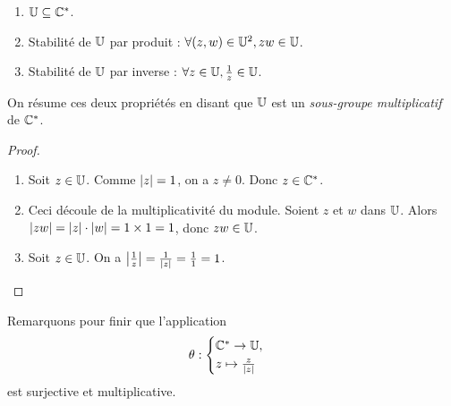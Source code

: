 \begin{proposition}
\begin{enumerate}
\item $\mathbb{U} \subseteq \mathbb{C}^*$.
\item Stabilité de $\mathbb{U}$ par produit : $\forall (z,w)\in\mathbb{U}^2, zw\in\mathbb{U}$.
\item Stabilité de $\mathbb{U}$ par inverse : $\forall z\in\mathbb{U}, \frac{1}{z} \in\mathbb{U}$.
\end{enumerate}
On résume ces deux propriétés en disant que $\mathbb{U}$ est un \emph{sous-groupe multiplicatif} de $\mathbb{C}^*$.
\end{proposition}
\begin{proof}
\begin{enumerate}
\item Soit $z\in\mathbb{U}$. Comme $\left\lvert z\right\rvert=1$, on a $z\neq 0$. Donc $z\in\mathbb{C}^*$.
\item Ceci découle de la multiplicativité du module. Soient $z$ et $w$ dans $\mathbb{U}$. Alors $\left\lvert zw\right\rvert = \left\lvert z\right\rvert \cdot \left\lvert w\right\rvert = 1\times 1 = 1$, donc $zw\in\mathbb{U}$.
\item Soit $z\in\mathbb{U}$. On a $\left\lvert\frac1z\right\rvert = \frac{1}{\left\lvert z\right\rvert} = \frac11=1$.
\end{enumerate}
\end{proof}



Remarquons pour finir que l'application
\[ \theta : \begin{cases}\mathbb{C}^* \to \mathbb{U},\\ z\mapsto \frac{z}{|z|}\end{cases}\]
est surjective et multiplicative.
